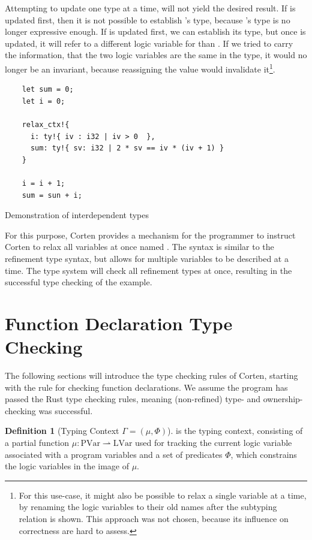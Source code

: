 \documentclass[twoside, english]{sdqthesis}
\theoremstyle{definition}
\newtheorem{definition}[theorem]{Definition}
\begin{document}
Attempting to update one type at a time, will not yield the desired result. If  is updated first, then it is not possible to establish 's type, because 's type is no longer expressive enough.
If  is updated first, we can establish its type, but once  is updated, it will refer to a different logic variable for  than . If we tried to carry the information, that the two logic variables are the same in the type, it would no longer be an invariant, because reassigning the value would invalidate it\footnote{
  For this use-case, it might also be possible to relax a single variable at a time, by renaming the logic variables to their old names after the subtyping relation is shown. This approach was not chosen, because its influence on correctness are hard to assess.
}.

\begin{listing}[ht]
  \begin{verbatim}
    let sum = 0;
    let i = 0;
    
    relax_ctx!{
      i: ty!{ iv : i32 | iv > 0  },
      sum: ty!{ sv: i32 | 2 * sv == iv * (iv + 1) }
    }

    i = i + 1;
    sum = sun + i;

  \end{verbatim}
  \caption{Demonstration of interdependent types}
  \label{lst:mutual-reference}
\end{listing}

For this purpose, Corten provides a mechanism for the programmer to instruct Corten to relax all variables at once \- named . The syntax is similar to the refinement type syntax, but allows for multiple variables to be described at a time. The type system will check all refinement types at once, resulting in the successful type checking of the example.

\section{Function Declaration Type Checking}

The following sections will introduce the type checking rules of Corten, starting with the rule for checking function declarations. We assume the program has passed the Rust type checking rules, meaning (non-refined) type- and ownership-checking was successful.

\begin{definition}[Typing Context $\Gamma = (\mu, \Phi)$]
  is the typing context, consisting of a partial function $\mu : \text{PVar} \rightharpoonup \text{LVar}$ used for tracking the current logic variable associated with a program variables and a set of predicates $\Phi$, which constrains the logic variables in the image of $\mu$.
\end{definition}
\end{document}
